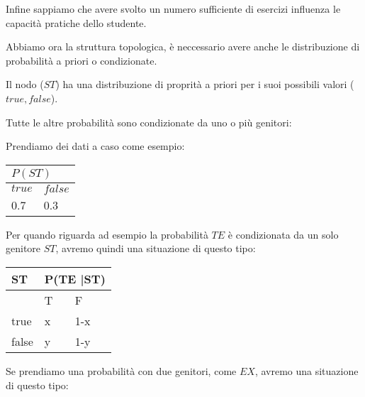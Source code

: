 \documentclass{article}
\begin{document}
Infine sappiamo che avere svolto un numero sufficiente di esercizi influenza le capacità pratiche dello studente.

\begin{center}
\end{center}
\pagebreak
 
 Abbiamo ora la struttura topologica, è neccessario avere anche le distribuzione di probabilità a priori o condizionate.

Il nodo (\(ST\)) ha una distribuzione di proprità a priori per i suoi possibili valori (\({true, false}\)).

Tutte le altre probabilità sono condizionate da uno o più genitori:

Prendiamo dei dati a caso come esempio:
\\

\begin{tabular}{|ll|}
	\hline
	\multicolumn{2}{|l|}{\(P(ST) \)}         \\ \hline
	\multicolumn{1}{|l|}{\(true\)} & \(false\) \\ \hline
	\multicolumn{1}{|l|}{0.7}  & 0.3   \\ \hline
\end{tabular}



Per quando riguarda ad esempio la probabilità \(TE\)  è condizionata da un solo genitore \(ST\), avremo quindi una situazione di questo tipo:
\\

\begin{tabular}{|l|ll|}
	\hline
	ST    & \multicolumn{2}{l|}{P(TE |ST)} \\ \hline
	& \multicolumn{1}{l|}{T}   & F   \\ \hline
	true  & \multicolumn{1}{l|}{x}   & 1-x    \\ \hline
	false & \multicolumn{1}{l|}{y}   & 1-y   \\ \hline
\end{tabular}

Se prendiamo una probabilità con due genitori, come \(EX\), avremo una situazione di questo tipo:
\\
\end{document}
